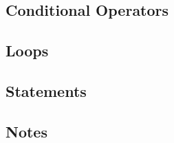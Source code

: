 \documentclass[12pt]{article}
\begin{document}
\subsection{Conditional Operators}

\subsection{Loops}

\subsection{Statements}

\subsection{Notes}
\end{document}
